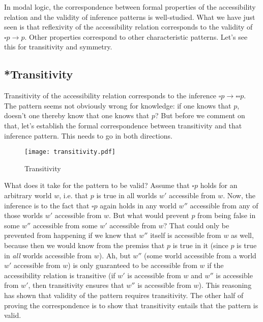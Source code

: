 In modal logic, the correspondence between formal properties of the accessibility relation and the validity of inference patterns is well-studied. What we have just seen is that reflexivity of the accessibility relation corresponds to the validity of $\square p \rightarrow p$. Other properties correspond to other characteristic patterns. Let's see this for transitivity and symmetry.

\subsection{*Transitivity} \label{sec:transitivity}

Transitivity of the accessibility relation corresponds to the inference $\square p \rightarrow \square \square p$. The pattern seems not obviously wrong for knowledge: if one knows that $p$, doesn't one thereby know that one knows that $p$? But before we comment on that, let's establish the formal correspondence between transitivity and that inference pattern. This needs to go in both directions.
  
\begin{figure}[htbp]
  \centering
    \texttt{[image: transitivity.pdf]}
  \caption{Transitivity}
  \label{fig:transitivity}
\end{figure}

\noindent What does it take for the pattern to be valid? Assume that $\square p$ holds for an arbitrary world $w$, i.e. that $p$ is true in all worlds $w'$ accessible from $w$. Now, the inference is to the fact that $\square p$ again holds in any world $w''$ accessible from any of those worlds $w'$ accessible from $w$. But what would prevent $p$ from being false in some $w''$ accessible from some $w'$ accessible from $w$? That could only be prevented from happening if we knew that $w''$ itself is accessible from $w$ as well, because then we would know from the premiss that $p$ is true in it (since $p$ is true in \emph{all} worlds accessible from $w$). Ah, but $w''$ (some world accessible from a world $w'$ accessible from $w$) is only guaranteed to be accessible from $w$ if the accessibility relation is transitive (if $w'$ is accessible from $w$ and $w''$ is accessible from $w'$, then transitivity ensures that $w''$ is accessible from $w$). This reasoning has shown that validity of the pattern requires transitivity. The other half of proving the correspondence is to show that transitivity entails that the pattern is valid.

